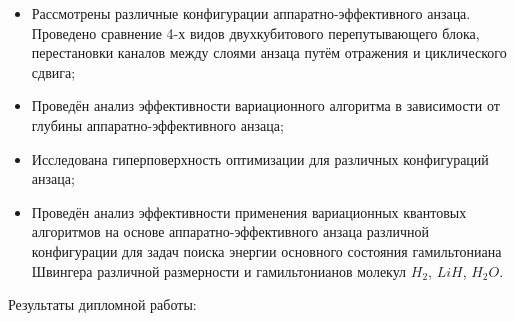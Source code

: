 \documentclass[14pt]{extarticle}
\begin{document}
\begin{itemize}

\item Рассмотрены различные конфигурации аппаратно-эффективного анзаца. Проведено сравнение 4-х видов двухкубитового перепутывающего блока, перестановки каналов между слоями анзаца путём отражения и циклического сдвига;

\item Проведён анализ эффективности вариационного алгоритма в зависимости от глубины аппаратно-эффективного анзаца;

\item Исследована гиперповерхность оптимизации для различных конфигураций анзаца;

\item Проведён анализ эффективности применения вариационных квантовых алгоритмов на основе аппаратно-эффективного анзаца различной конфигурации для задач поиска энергии основного состояния гамильтониана Швингера различной размерности и гамильтонианов молекул $H_2$, $LiH$, $H_2O$. 

\end{itemize}


\qquad Результаты дипломной работы:
\end{document}
